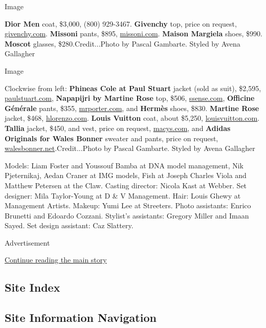Image

\textbf{Dior Men} coat, \$3,000, (800) 929-3467. \textbf{Givenchy} top,
price on request, \href{http://givenchy.com/}{givenchy.com}.
\textbf{Missoni} pants, \$895, \href{http://missoni.com/}{missoni.com}.
\textbf{Maison Margiela} shoes, \$990. \textbf{Moscot} glasses,
\$280.Credit...Photo by Pascal Gambarte. Styled by Avena Gallagher

Image

Clockwise from left: \textbf{Phineas Cole at Paul Stuart} jacket (sold
as suit), \$2,595, \href{https://www.paulstuart.com/}{paulstuart.com},
\textbf{Napapijri by Martine Rose} top, \$506,
\href{https://www.ssense.com/}{ssense.com}, \textbf{Officine Générale}
pants, \$355, \href{https://www.mrporter.com/en-us/}{mrporter.com}, and
\textbf{Hermès} shoes, \$830. \textbf{Martine Rose} jacket, \$468,
\href{https://www.hlorenzo.com/}{hlorenzo.com}. \textbf{Louis Vuitton}
coat, about \$5,250,
\href{https://www.louisvuitton.com/}{louisvuitton.com}. \textbf{Tallia}
jacket, \$450, and vest, price on request,
\href{https://www.macys.com/}{macys.com}, and \textbf{Adidas Originals
for Wales Bonner} sweater and pants, price on request,
\href{https://walesbonner.net/}{walesbonner.net}.Credit...Photo by
Pascal Gambarte. Styled by Avena Gallagher

Models: Liam Foster and Youssouf Bamba at DNA model management, Nik
Pjeternikaj, Aedan Craner at IMG models, Fish at Joseph Charles Viola
and Matthew Petersen at the Claw. Casting director: Nicola Kast at
Webber. Set designer: Mila Taylor-Young at D \& V Management. Hair:
Louis Ghewy at Management Artists. Makeup: Yumi Lee at Streeters. Photo
assistants: Enrico Brunetti and Edoardo Cozzani. Stylist's assistants:
Gregory Miller and Imaan Sayed. Set design assistant: Caz Slattery.

Advertisement

\protect\hyperlink{after-bottom}{Continue reading the main story}

\hypertarget{site-index}{%
\subsection{Site Index}\label{site-index}}

\hypertarget{site-information-navigation}{%
\subsection{Site Information
Navigation}\label{site-information-navigation}}

